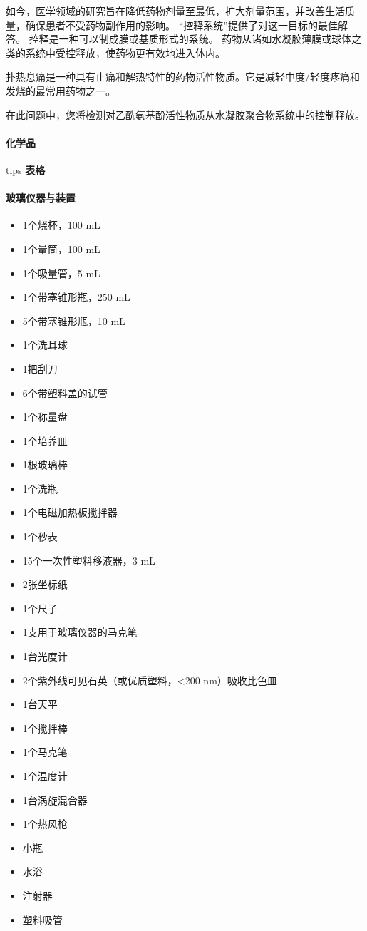 如今，医学领域的研究旨在降低药物剂量至最低，扩大剂量范围，并改善生活质量，确保患者不受药物副作用的影响。
``控释系统''提供了对这一目标的最佳解答。
控释是一种可以制成膜或基质形式的系统。
药物从诸如水凝胶薄膜或球体之类的系统中受控释放，使药物更有效地进入体内。

扑热息痛是一种具有止痛和解热特性的药物活性物质。它是减轻中度/轻度疼痛和发烧的最常用药物之一。

在此问题中，您将检测对乙酰氨基酚活性物质从水凝胶聚合物系统中的控制释放。

\paragraph{化学品}

tips \textbf{表格}

\paragraph{玻璃仪器与装置}

\begin{itemize}
\tightlist
\item
  1个烧杯，100 mL
\item
  1个量筒，100 mL
\item
  1个吸量管，5 mL
\item
  1个带塞锥形瓶，250 mL
\item
  5个带塞锥形瓶，10 mL
\item
  1个洗耳球
\item
  1把刮刀
\item
  6个带塑料盖的试管
\item
  1个称量盘
\item
  1个培养皿
\item
  1根玻璃棒
\item
  1个洗瓶
\item
  1个电磁加热板搅拌器
\item
  1个秒表
\item
  15个一次性塑料移液器，3 mL
\item
  2张坐标纸
\item
  1个尺子
\item
  1支用于玻璃仪器的马克笔
\item
  1台光度计
\item
  2个紫外线可见石英（或优质塑料，\textless{}200 nm）吸收比色皿
\item
  1台天平
\item
  1个搅拌棒
\item
  1个马克笔
\item
  1个温度计
\item
  1台涡旋混合器
\item
  1个热风枪
\item
  小瓶
\item
  水浴
\item
  注射器
\item
  塑料吸管
\end{itemize}

